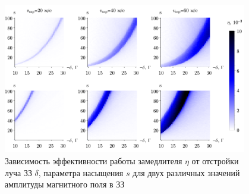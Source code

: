 \begin{figure}[ht]
    \centering
    \hspace{2 mm} 
    \includegraphics[width=0.95\textwidth]{figs/etas_v4.pdf}
    \caption{Зависимость эффективности работы замедлителя $\eta$ от отстройки луча ЗЗ $\delta$, параметра насыщения $s$ для двух различных значений амплитуды магнитного поля в ЗЗ}
    \label{fig:eta}
\end{figure}





